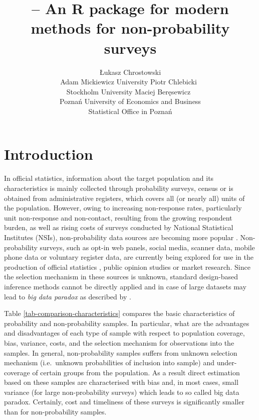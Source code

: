 \documentclass[
]{jss}
\author{
Łukasz Chrostowski\\Adam Mickiewicz University \And Piotr
Chlebicki~\orcidlink{0009-0006-4867-7434}\\Stockholm University
\AND Maciej Beręsewicz~\orcidlink{0000-0002-8281-4301}\\Poznań
University of Economics and Business\\
Statistical Office in Poznań
}
\title{\pkg{nonprobsvy} -- An R package for modern methods for
non-probability surveys}
\begin{document}
\section{Introduction}\label{sec-introduction}

In official statistics, information about the target population and its
characteristics is mainly collected through probability surveys, census
or is obtained from administrative registers, which covers all (or
nearly all) units of the population. However, owing to increasing
non-response rates, particularly unit non-response and non-contact,
resulting from the growing respondent burden, as well as rising costs of
surveys conducted by National Statistical Institutes (NSIs),
non-probability data sources are becoming more popular
\citep{berkesewicz2017two, beaumont2020probability, biffignandi2021handbook}.
Non-probability surveys, such as opt-in web panels, social media,
scanner data, mobile phone data or voluntary register data, are
currently being explored for use in the production of official
statistics \citep{citro2014multiple,daas2015big}, public opinion studies
or market research. Since the selection mechanism in these sources is
unknown, standard design-based inference methods cannot be directly
applied and in case of large datasets may lead to
\textit{big data paradox} as described by \citet{meng2018statistical}.

Table \ref{tab-comparison-characteristics} compares the basic
characteristics of probability and non-probability samples. In
particular, what are the advantages and disadvantages of each type of
sample with respect to population coverage, bias, variance, costs, and
the selection mechanism for observations into the samples. In general,
non-probability samples suffers from unknown selection mechanism
(i.e.~unknown probabilities of inclusion into sample) and under-coverage
of certain groups from the population. As a result direct estimation
based on these samples are characterised with bias and, in most cases,
small variance (for large non-probability surveys) which leads to so
called big data paradox. Certainly, cost and timeliness of these surveys
is significantly smaller than for non-probability samples.
\end{document}
